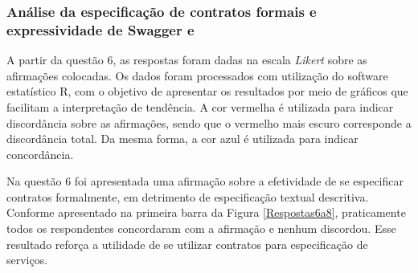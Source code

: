   
   

\subsubsection{Análise da especificação de contratos formais e expressividade
de Swagger e \neoidl{}}

A partir da questão 6, as respostas foram dadas na escala \textit{Likert} sobre
as afirmações colocadas. Os dados foram processados com utilização do software
estatístico R, com o objetivo de apresentar os resultados por meio de gráficos
que facilitam a interpretação de tendência. A cor vermelha é utilizada para
indicar discordância sobre as afirmações, sendo que o vermelho mais escuro
corresponde a discordância total. Da mesma forma, a cor azul é utilizada para
indicar concordância.

Na questão 6 foi apresentada uma afirmação sobre a efetividade de se especificar
contratos formalmente, em detrimento de especificação textual descritiva.
Conforme apresentado na primeira barra da Figura \ref{Respostas6a8},
praticamente todos os respondentes concordaram com a afirmação e nenhum
discordou. Esse resultado reforça a utilidade de se utilizar contratos para
especificação de serviços.



